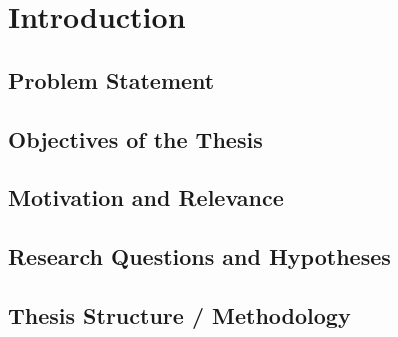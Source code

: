 \chapter{Introduction}
\label{chap:intro}

\section{Problem Statement}

\section{Objectives of the Thesis}

\section{Motivation and Relevance}

\section{Research Questions and Hypotheses}

\section{Thesis Structure / Methodology}
